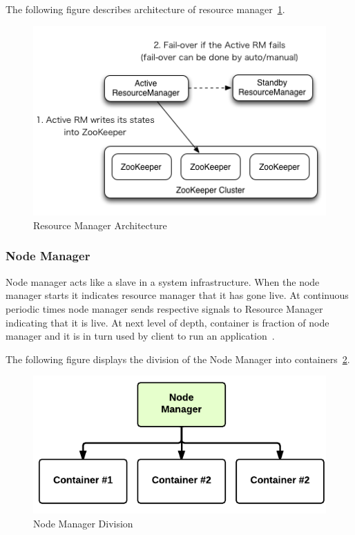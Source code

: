 The following figure describes architecture 
of resource manager~\ref{s:archires}.

\begin{figure}[!ht]
\centering\includegraphics[width=\textwidth]{images/YARNResourceManager.png}
\caption{Resource 
Manager 
Architecture~\cite{hid-sp18-412-ResourceManager_Architecture}}\label{s:archires}
\end{figure}

\subsubsection{Node Manager}
Node manager acts like a slave in a 
system infrastructure. 
When the node manager starts it indicates resource manager 
that it has gone live. At continuous periodic times node manager
sends respective signals to Resource Manager indicating that it is live. 
At next level of depth, container is fraction of node manager 
and it is in turn used by 
client to run an application~\cite{hid-sp18-412-YARN_Hadoop_Internal}.

The following figure displays the division of the Node Manager into 
containers~\ref{s:archinode}.

\begin{figure}[!ht]
\centering\includegraphics[width=\textwidth]{images/nodemanager.png}
\caption{Node 
Manager 
Division~\cite{hid-sp18-412-YARN_Hadoop_Internal}}\label{s:archinode}
\end{figure}

